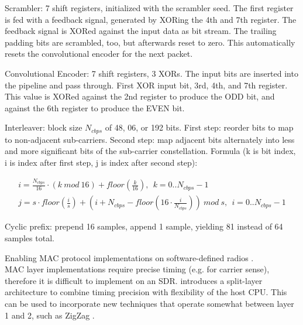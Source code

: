 Scrambler: 7 shift registers, initialized with the scrambler seed. The first register is fed with a feedback signal, generated by XORing the 4th and 7th register. The feedback signal is XORed against the input data as bit stream. The trailing padding bits are scrambled, too, but afterwards reset to zero. This automatically resets the convolutional encoder for the next packet.

Convolutional Encoder: 7 shift registers, 3 XORs. The input bits are inserted into the pipeline and pass through. First XOR input bit, 3rd, 4th, and 7th register. This value is XORed against the 2nd register to produce the ODD bit, and against the 6th register to produce the EVEN bit.

Interleaver: block size $N_{cbps}$ of 48, 06, or 192 bits. First step: reorder bits to map to non-adjacent sub-carriers. Second step: map adjacent bits alternately into less and more significant bits of the sub-carrier constellation. Formula (k is bit index, i is index after first step, j is index after second step):

\begin{align}
  i = \frac{N_{cbps}}{16} \cdot (k ~mod ~16) + floor(\frac{k}{16}), ~~k = 0 .. N_{cbps} - 1 \\
  j = s \cdot floor(\frac{i}{s}) + (i + N_{cbps} - floor(16 \cdot \frac{i}{N_{cbps}})) ~mod ~s, ~~i = 0 .. N_{cbps} - 1  \label{eqn:interleaving}
\end{align}

Cyclic prefix: prepend 16 samples, append 1 sample, yielding 81 instead of 64 samples total.

Enabling MAC protocol implementations on software-defined radios \cite{nychis2009}.\\

MAC layer implementations require precise timing (e.g. for carrier sense), therefore it is difficult to implement on an SDR. \cite{nychis2009} introduces a split-layer architecture to combine timing precision with flexibility of the host CPU. This can be used to incorporate new techniques that operate somewhat between layer 1 and 2, such as ZigZag \cite{gollakota2008}.
